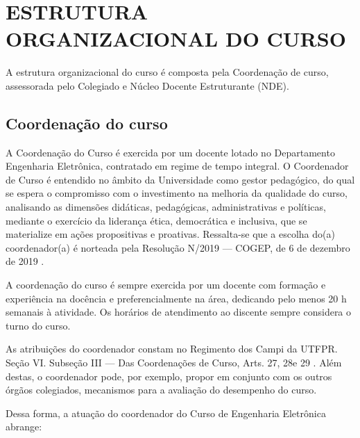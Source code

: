 \chapter{ESTRUTURA ORGANIZACIONAL DO CURSO}

A estrutura organizacional do curso é composta pela Coordenação de curso, assessorada pelo Colegiado e Núcleo Docente Estruturante (NDE).

\section{Coordenação do curso}

A Coordenação do Curso é exercida por um docente lotado no Departamento Engenharia Eletrônica, contratado em regime de tempo integral. O Coordenador de Curso é entendido no âmbito da Universidade como gestor pedagógico, do qual se espera o compromisso com o investimento na melhoria da qualidade do curso, analisando as dimensões didáticas, pedagógicas, administrativas e políticas, mediante o exercício da liderança ética, democrática e inclusiva, que se materialize em ações propositivas e proativas. Ressalta-se que a escolha do(a) coordenador(a) é norteada pela Resolução N/2019 — COGEP, de 6 de dezembro de 2019 \cite{cogep145}.

A coordenação do curso é sempre exercida por um docente com formação e experiência na docência e preferencialmente na área, dedicando pelo menos 20 h semanais à atividade. Os horários de atendimento ao discente sempre considera o turno do curso.

As atribuições do coordenador constam no Regimento dos Campi da UTFPR. Seção VI. Subseção III — Das Coordenações de Curso, Arts. 27\textordmasculine, 28\textordmasculine e 29\textordmasculine{} \cite{regimento}. Além destas, o coordenador pode, por exemplo, propor em conjunto com os outros órgãos colegiados, mecanismos para a avaliação do desempenho do curso.

Dessa forma, a atuação do coordenador do Curso de Engenharia Eletrônica abrange:

